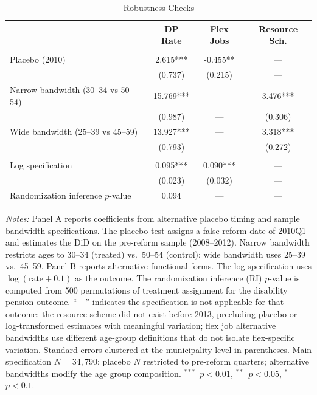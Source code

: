 \begin{table}[htbp]
\centering
\caption{Robustness Checks}
\label{tab:robustness}
\small
\begin{tabular}{l*{3}{c}}
\toprule
 & DP Rate & Flex Jobs & Resource Sch. \\
\midrule
\addlinespace
\multicolumn{4}{l}{\textit{Panel A: Placebo and Bandwidth}} \\
\addlinespace
Placebo (2010) & 2.615*** & -0.455** & --- \\
 & (0.737) & (0.215) & --- \\
\addlinespace
Narrow bandwidth (30--34 vs 50--54) & 15.769*** & --- & 3.476*** \\
 & (0.987) & --- & (0.306) \\
\addlinespace
Wide bandwidth (25--39 vs 45--59) & 13.927*** & --- & 3.318*** \\
 & (0.793) & --- & (0.272) \\
\addlinespace
\midrule
\multicolumn{4}{l}{\textit{Panel B: Alternative Specifications}} \\
\addlinespace
Log specification & 0.095*** & 0.090*** & --- \\
 & (0.023) & (0.032) & --- \\
\addlinespace
Randomization inference $p$-value & 0.094 & --- & --- \\
\bottomrule
\end{tabular}
\begin{tablenotes}
\small
\item \textit{Notes:} Panel A reports coefficients from alternative placebo timing and sample bandwidth specifications. The placebo test assigns a false reform date of 2010Q1 and estimates the DiD on the pre-reform sample (2008--2012). Narrow bandwidth restricts ages to 30--34 (treated) vs.\ 50--54 (control); wide bandwidth uses 25--39 vs.\ 45--59. Panel B reports alternative functional forms. The log specification uses $\log(\text{rate} + 0.1)$ as the outcome. The randomization inference (RI) $p$-value is computed from 500 permutations of treatment assignment for the disability pension outcome. ``---'' indicates the specification is not applicable for that outcome: the resource scheme did not exist before 2013, precluding placebo or log-transformed estimates with meaningful variation; flex job alternative bandwidths use different age-group definitions that do not isolate flex-specific variation. Standard errors clustered at the municipality level in parentheses. Main specification $N = 34{,}790$; placebo $N$ restricted to pre-reform quarters; alternative bandwidths modify the age group composition. $^{***}$~$p<0.01$, $^{**}$~$p<0.05$, $^{*}$~$p<0.1$.
\end{tablenotes}
\end{table}
